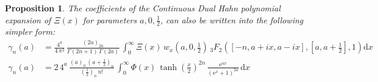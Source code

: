 \documentclass[a4paper,11pt,twoside]{amsart}
\newtheorem{proposition}[theorem]{Proposition}
\newcommand{\verifiedeq}{=}
\newcommand{\verifiedeq}{\stackrel{\checkmark}{=}}
\begin{document}
\begin{proposition}
The coefficients of the Continuous Dual Hahn polynomial expansion of $\Xi(x)$ for parameters $a,0,\frac12$, can also be written into the following simpler form:   
\begin{align}
  \gamma_n(a) &\verifiedeq \frac{4^a}{4\,\pi^2}\,\frac{(2a)_{2n}}{\Gamma(2n+1)\,\Gamma(2a)}\,\int_{0}^{\infty} \Xi(x)\,w_x\left(a,0,\frac12\right)\,{}_3F_2\left([-n,a+ix,a-ix],\left[a,a+\frac12\right],1\right)\mathrm{d}x \\
  \gamma_n(a) &\verifiedeq 2\,4^a\,\frac{(a)_n\,\left(a+\frac12\right)_n}{\left(\frac12\right)_n\,n!}\,\int_{0}^{\infty} \Phi(x)\,\tanh\left(\frac{x}{2}\right)^{2n}\,\frac{\mathrm{e}^{ax}}{(\mathrm{e}^x+1)^{2a}}\,\mathrm{d}x
\end{align}
\end{proposition}
\end{document}
